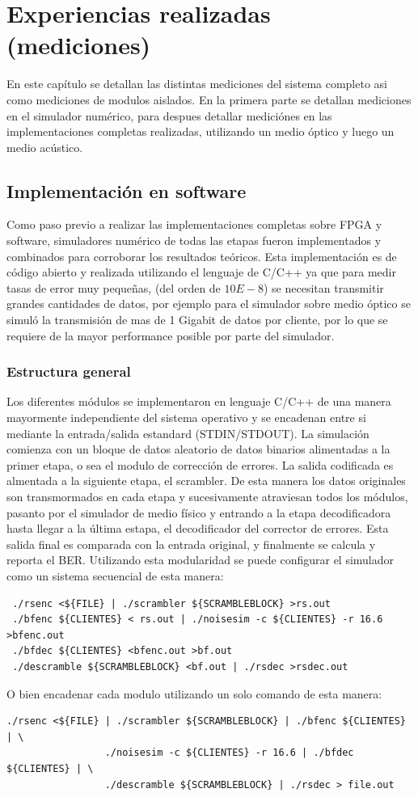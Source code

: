 \chapter{Experiencias realizadas (mediciones)}
En este capítulo se detallan las distintas mediciones del sistema completo asi como mediciones de modulos aislados. 
En la primera parte se detallan mediciones en el simulador numérico, para despues detallar mediciónes en las implementaciones completas realizadas, utilizando un medio óptico y luego un medio acústico.
\section{Implementación en software}
Como paso previo a realizar las implementaciones completas sobre FPGA y software, simuladores numérico de todas las etapas fueron implementados y combinados para corroborar los resultados teóricos. Esta implementación es de código abierto y realizada utilizando el lenguaje de C/C++ ya que para medir tasas de error muy pequeñas, (del orden de $10E-8$) se necesitan transmitir grandes cantidades de datos, por ejemplo para el simulador sobre medio óptico se simuló la transmisión de mas de 1 Gigabit de datos por cliente, por lo que se requiere de la mayor performance posible por parte del simulador.
\subsection{Estructura general}
Los diferentes módulos se implementaron en lenguaje C/C++ de una manera mayormente independiente del sistema operativo y se encadenan entre si mediante la entrada/salida estandard (STDIN/STDOUT). La simulación comienza con un bloque de datos aleatorio de datos binarios alimentadas a la primer etapa, o sea el modulo de corrección de errores. La salida codificada es almentada a la siguiente etapa, el scrambler. De esta manera los datos originales son transmormados en cada etapa y sucesivamente atraviesan todos los módulos, pasanto por el simulador de medio físico y entrando a la etapa decodificadora hasta llegar a la última estapa, el decodificador del corrector de errores. Esta salida final es comparada con la entrada original, y finalmente se calcula y reporta el BER.
Utilizando esta modularidad se puede configurar el simulador como un sistema secuencial de esta manera:

\small
\begin{verbatim}
 ./rsenc <${FILE} | ./scrambler ${SCRAMBLEBLOCK} >rs.out
 ./bfenc ${CLIENTES} < rs.out | ./noisesim -c ${CLIENTES} -r 16.6 >bfenc.out
 ./bfdec ${CLIENTES} <bfenc.out >bf.out
 ./descramble ${SCRAMBLEBLOCK} <bf.out | ./rsdec >rsdec.out
\end{verbatim}
\normalsize
O bien encadenar cada modulo utilizando un solo comando de esta manera:
\small
\begin{verbatim}
./rsenc <${FILE} | ./scrambler ${SCRAMBLEBLOCK} | ./bfenc ${CLIENTES} | \
                 ./noisesim -c ${CLIENTES} -r 16.6 | ./bfdec ${CLIENTES} | \ 
                 ./descramble ${SCRAMBLEBLOCK} | ./rsdec > file.out
\end{verbatim}
\normalsize

